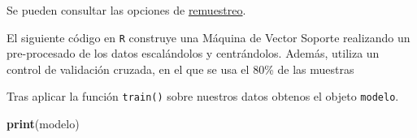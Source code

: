 \documentclass[12pt,spanish,a4paper]{article}
\newenvironment{Shaded}{\begin{snugshade}}{\end{snugshade}}
\newcommand{\KeywordTok}[1]{\textcolor[rgb]{0.13,0.29,0.53}{\textbf{#1}}}
\newcommand{\DataTypeTok}[1]{\textcolor[rgb]{0.13,0.29,0.53}{#1}}
\newcommand{\DecValTok}[1]{\textcolor[rgb]{0.00,0.00,0.81}{#1}}
\newcommand{\FloatTok}[1]{\textcolor[rgb]{0.00,0.00,0.81}{#1}}
\newcommand{\StringTok}[1]{\textcolor[rgb]{0.31,0.60,0.02}{#1}}
\newcommand{\OtherTok}[1]{\textcolor[rgb]{0.56,0.35,0.01}{#1}}
\newcommand{\OperatorTok}[1]{\textcolor[rgb]{0.81,0.36,0.00}{\textbf{#1}}}
\newcommand{\NormalTok}[1]{#1}
\numberwithin{equation}{section}
\begin{document}
Se pueden consultar las opciones de
\href{http://topepo.github.io/caret/subsampling-for-class-imbalances.html}{remuestreo}.

El siguiente código en \texttt{R} construye una Máquina de Vector
Soporte realizando un pre-procesado de los datos escalándolos y
centrándolos. Además, utiliza un control de validación cruzada, en el
que se usa el 80\% de las muestras

\begin{Shaded}
\end{Shaded}

Tras aplicar la función \texttt{train()} sobre nuestros datos obtenos el
objeto \texttt{modelo}.

\begin{Shaded}
\begin{Highlighting}[]
\KeywordTok{print}\NormalTok{(modelo)}
\end{Highlighting}
\end{Shaded}
\end{document}
